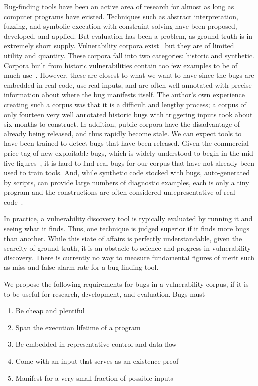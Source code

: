 \label{sec:motivation}

Bug-finding tools have been an active area of research for almost as long as computer programs have existed. 
Techniques such as abstract interpretation, fuzzing, and symbolic execution with constraint solving have been proposed, developed, and applied.
But evaluation has been a problem, as  ground truth is in extremely short supply.
Vulnerability corpora exist~\cite{Kass:2005} but they are of limited utility and quantity.
These corpora fall into two categories: historic and synthetic.
Corpora built from historic vulnerabilities contain too few examples to be of much use~\cite{Zitser:2004}.
However, these are closest to what we want to have since the bugs are embedded in real code, use real inputs, and are often well annotated with precise information about where the bug manifests itself.
The author's own experience creating such a corpus was that it is a difficult and lengthy process; a corpus of only fourteen very well annotated historic bugs with triggering inputs took about six months to construct. 
In addition, public corpora have the disadvantage of already being released, and thus rapidly become stale.
We can expect tools to have been trained to detect bugs that have been released.
Given the commercial price tag of new exploitable bugs, which is widely understood to begin in the mid five figures~\cite{Tsyrklevich:2015}, it is hard to find real bugs for our corpus that have not already been used to train tools.
And, while synthetic code stocked with bugs, auto-generated by scripts, can provide large numbers of diagnostic examples, each is only a tiny program and the constructions are often considered unrepresentative of real code~\cite{Kratkiewicz:2005,Juliet:2012}.

In practice, a vulnerability discovery tool is typically evaluated by running it and seeing what it finds. 
Thus, one technique is judged superior if it finds more bugs than another.
While this state of affairs is perfectly understandable, given the scarcity of ground truth, it is an obstacle to science and progress in vulnerability discovery.
There is currently no way to measure fundamental figures of merit such as miss and false alarm rate for a bug finding tool.

We propose the following requirements for bugs in a vulnerability corpus, if it is to be useful for research, development, and evaluation.
Bugs must

\begin{enumerate}
\item Be cheap and plentiful
\item Span the execution lifetime of a program
\item Be embedded in representative control and data flow
\item Come with an input that serves as an existence proof 
\item Manifest for a very small fraction of possible inputs
\end {enumerate}

